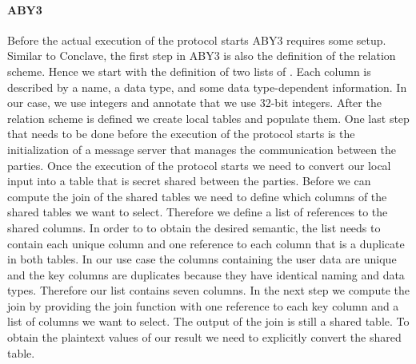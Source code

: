 \paragraph{ABY3}
Before the actual execution of the protocol starts ABY3 requires some setup. Similar to Conclave, the first step in ABY3 is also the definition of the relation scheme. Hence we start with the definition of two lists of \cite{ColumnInfos}. Each column is described by a name, a data type, and some data type-dependent information. In our case, we use integers and annotate that we use 32-bit integers. After the relation scheme is defined we create local tables and populate them. One last step that needs to be done before the execution of the protocol starts is the initialization of a message server that manages the communication between the parties.
Once the execution of the protocol starts we need to convert our local input into a table that is secret shared between the parties. 
Before we can compute the join of the shared tables we need to define which columns of the shared tables we want to select. Therefore we define a list of references to the shared columns. In order to to obtain the desired semantic, the list needs to contain each unique column and one reference to each column that is a duplicate in both tables. 
In our use case the columns containing the user data are unique and the key columns are duplicates because they have identical naming and data types. Therefore our list contains seven columns. In the next step we compute the join by providing the join function with one reference to each key column and a list of columns we want to select. The output of the join is still a shared table. To obtain the plaintext values of our result we need to explicitly convert the shared table.  


